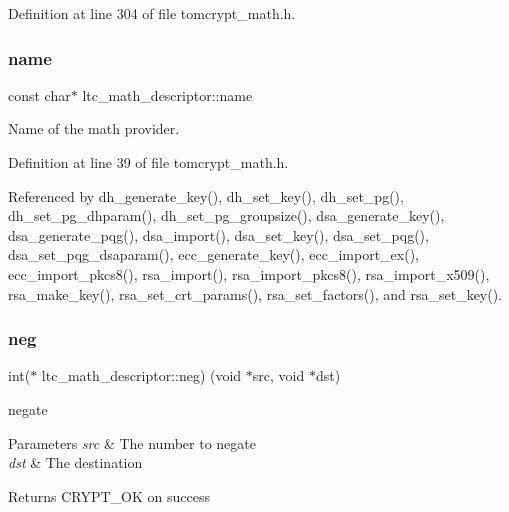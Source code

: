 Definition at line 304 of file tomcrypt\+\_\+math.\+h.

\mbox{\label{structltc__math__descriptor_a8838126de4a27e382f91096e369a2728}} 
\subsubsection{\texorpdfstring{name}{name}}
{\footnotesize\ttfamily const char$\ast$ ltc\+\_\+math\+\_\+descriptor\+::name}



Name of the math provider. 



Definition at line 39 of file tomcrypt\+\_\+math.\+h.



Referenced by dh\+\_\+generate\+\_\+key(), dh\+\_\+set\+\_\+key(), dh\+\_\+set\+\_\+pg(), dh\+\_\+set\+\_\+pg\+\_\+dhparam(), dh\+\_\+set\+\_\+pg\+\_\+groupsize(), dsa\+\_\+generate\+\_\+key(), dsa\+\_\+generate\+\_\+pqg(), dsa\+\_\+import(), dsa\+\_\+set\+\_\+key(), dsa\+\_\+set\+\_\+pqg(), dsa\+\_\+set\+\_\+pqg\+\_\+dsaparam(), ecc\+\_\+generate\+\_\+key(), ecc\+\_\+import\+\_\+ex(), ecc\+\_\+import\+\_\+pkcs8(), rsa\+\_\+import(), rsa\+\_\+import\+\_\+pkcs8(), rsa\+\_\+import\+\_\+x509(), rsa\+\_\+make\+\_\+key(), rsa\+\_\+set\+\_\+crt\+\_\+params(), rsa\+\_\+set\+\_\+factors(), and rsa\+\_\+set\+\_\+key().

\mbox{\label{structltc__math__descriptor_a5a6883b492216ee9047c10ce733b80b5}} 
\subsubsection{\texorpdfstring{neg}{neg}}
{\footnotesize\ttfamily int($\ast$ ltc\+\_\+math\+\_\+descriptor\+::neg) (void $\ast$src, void $\ast$dst)}



negate 


\begin{DoxyParams}{Parameters}
{\em src} & The number to negate \\
\hline
{\em dst} & The destination \\
\hline
\end{DoxyParams}
\begin{DoxyReturn}{Returns}
C\+R\+Y\+P\+T\+\_\+\+OK on success 
\end{DoxyReturn}


